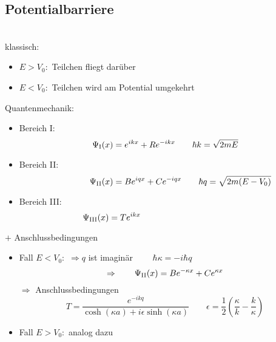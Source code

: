 
\subsection{Potentialbarriere}

\begin{center}
\end{center}
\\
klassisch:
\begin{itemize}
	\item $ E > V_0 : $ Teilchen fliegt darüber
	\item $ E < V_0 : $ Teilchen wird am Potential umgekehrt 
\end{itemize}
Quantenmechanik:
\begin{itemize}
	\item Bereich I:
	\begin{equation*}
	\, \Psi_{\textrm{I}}(x) = e^{i k x} + R e^{- i k x} \qquad \hbar k = \sqrt{2 m E}
	\end{equation*}
	\item Bereich II:
	\begin{equation*}
	\qquad \qquad \Psi_{\textrm{II}}(x) = B e^{i q x} + C e^{- i q x} \qquad \hbar q = \sqrt{2 m (E - V_0)} \
	\end{equation*}
	\item Bereich III:
	\begin{equation*}
	\Psi_{\tx{III}}(x) = T e^{i k x} \hspace{4.4cm}
	\end{equation*}
\end{itemize}
$ + $ Anschlussbedingungen
\begin{itemize}
	\item Fall $ E < V_0 : $ $ \Rightarrow  q $  ist imaginär $ \qquad \hbar \kappa = - i \hbar q $
	\begin{equation*}
	\Rightarrow \qquad \Psi_{\textrm{II}}(x) = B e^{- \kappa x} + C e^{\kappa x}
	\end{equation*}
	$ \Rightarrow $ Anschlussbedingungen\\
	\begin{equation*}
	T = \frac{e^{-ikq}}{\cosh (\kappa a) + i \epsilon \sinh (\kappa a)} \qquad \epsilon = \frac{1}{2} \left(\frac{\kappa}{k} - \frac{k}{\kappa}\right)
	\end{equation*}
	\item Fall $ E > V_0 : $ analog dazu
\end{itemize}
